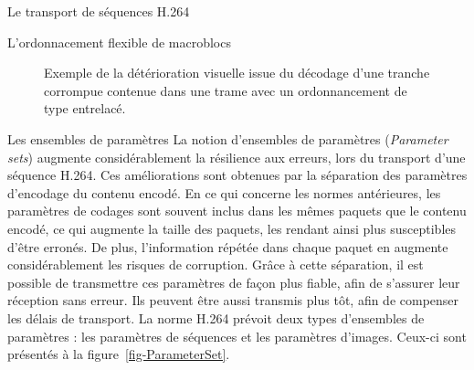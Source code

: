 \documentclass[letterpaper, twoside, 12pt,memoire]{thETS}
\newcommand{\ang}[1]{(\textit{#1})}
\newcommand{\fig}[1]{figure~\ref{#1}}
\begin{document}
\begin{chapter}{Le transport de séquences H.264}
\begin{section}{L'ordonnacement flexible de macroblocs}
\begin{figure}[htb]
\caption{Exemple de la détérioration visuelle issue du décodage d'une tranche
corrompue contenue dans une trame avec un ordonnancement de type entrelacé.}
\label{fig-ExempleEntrelace}
\end{figure}

\end{section}

\begin{section}{Les ensembles de paramètres}
\label{sect-ParameterSets}
La notion d'ensembles de paramètres \ang{Parameter sets} augmente
considérablement la résilience aux erreurs, lors du transport d'une séquence
H.264. Ces améliorations sont obtenues par la séparation des paramètres
d'encodage du contenu encodé. En ce qui concerne les normes antérieures, les
paramètres de codages sont souvent inclus dans les mêmes paquets que le contenu
encodé, ce qui augmente la taille des paquets, les rendant ainsi plus susceptibles
d'être erronés. De plus, l'information répétée dans chaque paquet en augmente
considérablement les risques de corruption. Grâce à cette séparation, il est
possible de transmettre ces paramètres de façon plus fiable, afin de s'assurer
leur réception sans erreur. Ils peuvent être aussi transmis plus tôt, afin de
compenser les délais de transport. La norme H.264 prévoit deux types d'ensembles
de paramètres : les paramètres de séquences et les paramètres d'images. Ceux-ci
sont présentés à la \fig{fig-ParameterSet}.


\end{section}
\end{chapter}
\end{document}
